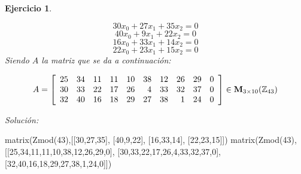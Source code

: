 \documentclass[12pt]{amsart}
\newtheorem{ejer}{Ejercicio}
\begin{document}
\begin{ejer}
\begin{minipage}{\textwidth}
\begin{tcolorbox}[colback = red!20!white,title=Versión Ecuaciones Implícitas]
\[ 30 x_{0} + 27 x_{1} + 35 x_{2} = 0 \]
\[ 40 x_{0} + 9 x_{1} + 22 x_{2} = 0 \]
\[ 16 x_{0} + 33 x_{1} + 14 x_{2} = 0 \]
\[ 22 x_{0} + 23 x_{1} + 15 x_{2} = 0 \]
Siendo $A$ la matriz que se da a continuación:
\end{tcolorbox}
\end{minipage}
\[ A = \left[\begin{array}{rrrrrrrrrr}
25 & 34 & 11 & 11 & 10 & 38 & 12 & 26 & 29 & 0 \\
30 & 33 & 22 & 17 & 26 & 4 & 33 & 32 & 37 & 0 \\
32 & 40 & 16 & 18 & 29 & 27 & 38 & 1 & 24 & 0
\end{array}\right] \in {\bf M}_{3\times 10}({\mathbb Z}_{43})\]
\end{ejer}

{\it Soluci\'on:}

\begin{sageblock}
matrix(Zmod(43),[[30,27,35],
[40,9,22],
[16,33,14],
[22,23,15]])
matrix(Zmod(43),[[25,34,11,11,10,38,12,26,29,0],
[30,33,22,17,26,4,33,32,37,0],
[32,40,16,18,29,27,38,1,24,0]])
\end{sageblock}

\end{document}
